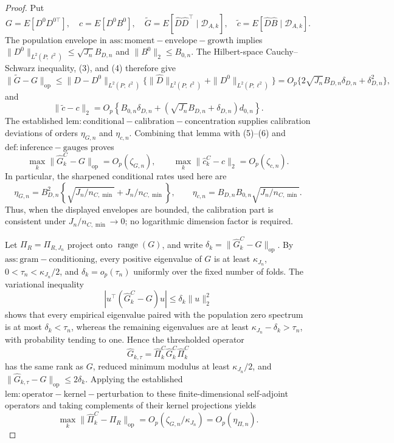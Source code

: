 \documentclass{article}
\begin{document}
\begin{proof}
Put
\[
 G=E[D^0D^{0\top}],\quad c=E[D^0B^0],\quad
 \widetilde G=E[\widehat D\widehat D^\top\mid\mathcal D_{A,k}],\quad
 \widetilde c=E[\widehat D\widehat B\mid\mathcal D_{A,k}].
\]
The population envelope in \(\mathrm{ass:moment-envelope-growth}\) implies
\(\|D^0\|_{L^2(P;\ell^2)}\le\sqrt{J_n}B_{D,n}\) and \(\|B^0\|_2\le B_{0,n}\).  The Hilbert-space Cauchy--Schwarz inequality, (3), and (4) therefore give
\[
 \|\widetilde G-G\|_{\mathrm{op}}
 \le \|\widehat D-D^0\|_{L^2(P;\ell^2)}
       \{\|\widehat D\|_{L^2(P;\ell^2)}+\|D^0\|_{L^2(P;\ell^2)}\}
 =O_p\{2\sqrt{J_n}B_{D,n}\delta_{D,n}+\delta_{D,n}^2\},                  \tag{5}
\]
and
\[
 \|\widetilde c-c\|_2
 =O_p\!\left\{B_{0,n}\delta_{D,n}
 +(\sqrt{J_n}B_{D,n}+\delta_{D,n})d_{0,n}\right\}.                       \tag{6}
\]
The established \(\mathrm{lem:conditional-calibration-concentration}\) supplies calibration deviations of orders \(\eta_{G,n}\) and \(\eta_{c,n}\).  Combining that lemma with (5)--(6) and \(\mathrm{def:inference-gauges}\) proves
\[
 \max_k\|\widehat G_k^C-G\|_{\mathrm{op}}=O_p(\zeta_{G,n}),\qquad
 \max_k\|\widehat c_k^C-c\|_2=O_p(\zeta_{c,n}).                          \tag{7}
\]
In particular, the sharpened conditional rates used here are
\[
 \eta_{G,n}=B_{D,n}^2\left\{\sqrt{J_n/n_{C,\min}}+J_n/n_{C,\min}\right\},
 \qquad
 \eta_{c,n}=B_{D,n}B_{0,n}\sqrt{J_n/n_{C,\min}}.
\]
Thus, when the displayed envelopes are bounded, the calibration part is consistent under \(J_n/n_{C,\min}\to0\); no logarithmic dimension factor is required.

Let \(\Pi_R=\Pi_{R,J_n}\) project onto \(\operatorname{range}(G)\), and write
\(\delta_k=\|\widehat G_k^C-G\|_{\mathrm{op}}\).  By \(\mathrm{ass:gram-conditioning}\), every positive eigenvalue of \(G\) is at least \(\kappa_{J_n}\), \(0<\tau_n<\kappa_{J_n}/2\), and \(\delta_k=o_p(\tau_n)\) uniformly over the fixed number of folds.  The variational inequality
\[
 |u^\top(\widehat G_k^C-G)u|\le\delta_k\|u\|_2^2                         \tag{8}
\]
shows that every empirical eigenvalue paired with the population zero spectrum is at most \(\delta_k<\tau_n\), whereas the remaining eigenvalues are at least \(\kappa_{J_n}-\delta_k>\tau_n\), with probability tending to one.  Hence the thresholded operator
\[
 \widehat G_{k,\tau}=\widehat\Pi_k^C\widehat G_k^C\widehat\Pi_k^C
\]
has the same rank as \(G\), reduced minimum modulus at least \(\kappa_{J_n}/2\), and
\(\|\widehat G_{k,\tau}-G\|_{\mathrm{op}}\le2\delta_k\).  Applying the established \(\mathrm{lem:operator-kernel-perturbation}\) to these finite-dimensional self-adjoint operators and taking complements of their kernel projections yields
\[
 \max_k\|\widehat\Pi_k^C-\Pi_R\|_{\mathrm{op}}
 =O_p(\zeta_{G,n}/\kappa_{J_n})=O_p(\eta_{\Pi,n}).                         \tag{9}
\]


\end{proof}
\end{document}
